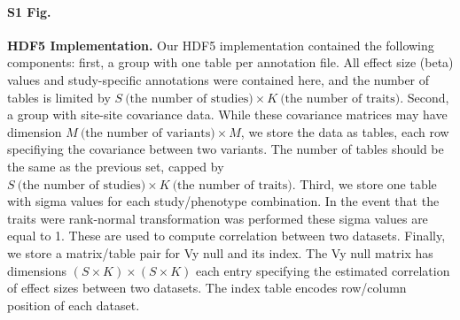 \paragraph*{S1 Fig.}
\label{S1_Fig}
{\bf HDF5 Implementation.} Our HDF5 implementation contained the following components: first, a group with one table per annotation file. All effect size (beta) values and study-specific annotations were contained here, and the number of tables is limited by $S\ \textrm{(the number of studies)} \times K\ \textrm{(the number of traits)}$. Second, a group with site-site covariance data. While these covariance matrices may have dimension $M\ \textrm{(the number of variants)} \times M$, we store the data as tables, each row specifiying the covariance between two variants. The number of tables should be the same as the previous set, capped by $S\ \textrm{(the number of studies)} \times K\ \textrm{(the number of traits)}$. Third, we store one table with sigma values for each study/phenotype combination. In the event that the traits were rank-normal transformation was performed these sigma values are equal to 1. These are used to compute correlation between two datasets. Finally, we store a matrix/table pair for Vy null and its index. The Vy null matrix has dimensions $ (S \times K) \times (S \times K)$ each entry specifying the estimated correlation of effect sizes between two datasets. The index table encodes row/column position of each dataset.

